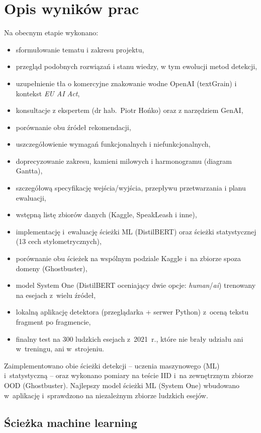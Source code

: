 \section{Opis wyników prac}

Na obecnym etapie wykonano:

\begin{itemize}
	\item sformułowanie tematu i zakresu projektu,
	\item przegląd podobnych rozwiązań i stanu wiedzy, w tym ewolucji metod detekcji,
	\item uzupełnienie tła o komercyjne znakowanie wodne OpenAI (textGrain) i kontekst \textit{EU AI Act},
	\item konsultacje z ekspertem (dr hab.\ Piotr Hońko) oraz z narzędziem GenAI,
	\item porównanie obu źródeł rekomendacji,
	\item uszczegółowienie wymagań funkcjonalnych i niefunkcjonalnych,
	\item doprecyzowanie zakresu, kamieni milowych i harmonogramu (diagram Gantta),
	\item szczegółową specyfikację wejścia/wyjścia, przepływu przetwarzania i planu ewaluacji,
	\item wstępną listę zbiorów danych (Kaggle, SpeakLeash i inne),
	\item implementację i~ewaluację ścieżki ML (DistilBERT) oraz ścieżki statystycznej (13 cech stylometrycznych),
	\item porównanie obu ścieżek na wspólnym podziale Kaggle i~na zbiorze spoza domeny (Ghostbuster),
	\item model System One (DistilBERT oceniający dwie opcje: \textit{human}/\textit{ai}) trenowany na esejach z~wielu źródeł,
	\item lokalną aplikację detektora (przeglądarka + serwer Python) z~oceną tekstu fragment po fragmencie,
	\item finalny test na 300 ludzkich esejach z~2021~r., które nie brały udziału ani w~treningu, ani w~strojeniu.
\end{itemize}

Zaimplementowano obie ścieżki detekcji -- uczenia maszynowego (ML) i~statystyczną -- oraz
wykonano pomiary na teście IID i~na zewnętrznym zbiorze OOD (Ghostbuster).
Najlepszy model ścieżki ML (System One) wbudowano w~aplikację i~sprawdzono na
niezależnym zbiorze ludzkich esejów.

\subsection{Ścieżka machine learning}

